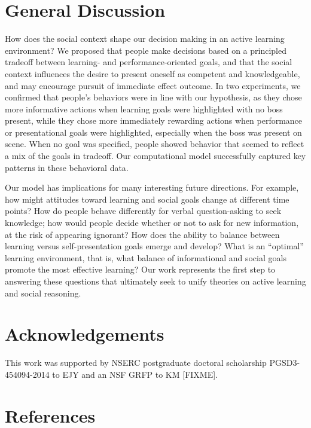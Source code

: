 \documentclass[10pt, letterpaper]{article}
\begin{document}
\section{General Discussion}\label{general-discussion}

How does the social context shape our decision making in an active
learning environment? We proposed that people make decisions based on a
principled tradeoff between learning- and performance-oriented goals,
and that the social context influences the desire to present oneself as
competent and knowledgeable, and may encourage pursuit of immediate
effect outcome. In two experiments, we confirmed that people's behaviors
were in line with our hypothesis, as they chose more informative actions
when learning goals were highlighted with no boss present, while they
chose more immediately rewarding actions when performance or
presentational goals were highlighted, especially when the boss was
present on scene. When no goal was specified, people showed behavior
that seemed to reflect a mix of the goals in tradeoff. Our computational
model successfully captured key patterns in these behavioral data.

Our model has implications for many interesting future directions. For
example, how might attitudes toward learning and social goals change at
different time points? How do people behave differently for verbal
question-asking to seek knowledge; how would people decide whether or
not to ask for new information, at the risk of appearing ignorant? How
does the ability to balance between learning versus self-presentation
goals emerge and develop? What is an ``optimal'' learning environment,
that is, what balance of informational and social goals promote the most
effective learning? Our work represents the first step to answering
these questions that ultimately seek to unify theories on active
learning and social reasoning.

\section{Acknowledgements}\label{acknowledgements}

This work was supported by NSERC postgraduate doctoral scholarship
PGSD3-454094-2014 to EJY and an NSF GRFP to KM {[}FIXME{]}.

\section{References}\label{references}
\end{document}
